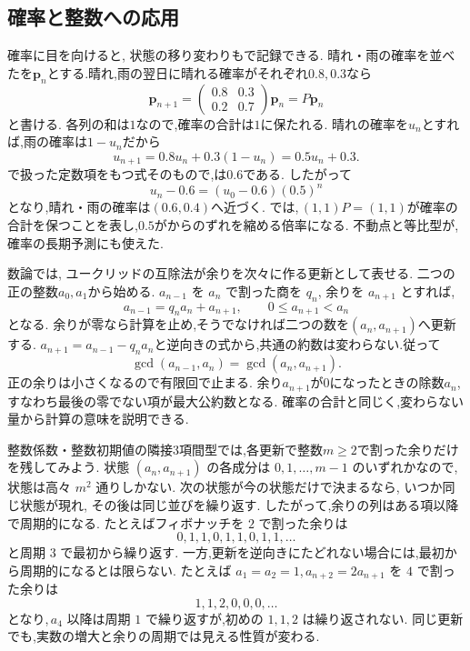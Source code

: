\subsection{確率と整数への応用}
確率に目を向けると, 状態の移り変わりもで記録できる.
晴れ・雨の確率を並べたを$\boldsymbol p_n$とする.晴れ,雨の翌日に晴れる確率がそれぞれ$0.8,0.3$なら
\[
  \boldsymbol p_{n+1}
  =
  \begin{pmatrix}0.8&0.3\\0.2&0.7\end{pmatrix}
  \boldsymbol p_n
  =P\boldsymbol p_n
\]
と書ける.
各列の和は$1$なので,確率の合計は$1$に保たれる.
晴れの確率を$u_n$とすれば,雨の確率は$1-u_n$だから
\[
  u_{n+1}=0.8u_n+0.3(1-u_n)=0.5u_n+0.3.
\]
で扱った定数項をもつ式そのもので,は$0.6$である.
したがって
\[
  u_n-0.6=(u_0-0.6)(0.5)^n
\]
となり,晴れ・雨の確率は$(0.6,0.4)$へ近づく.
では,\,$(1,1)P=(1,1)$が確率の合計を保つことを表し,$0.5$がからのずれを縮める倍率になる.
不動点と等比型が,確率の長期予測にも使えた.

数論では, ユークリッドの互除法が余りを次々に作る更新として表せる.
二つの正の整数$a_0,a_1$から始める.
$a_{n-1}$ を $a_n$ で割った商を $q_n$, 余りを $a_{n+1}$ とすれば,
\[
  a_{n-1}=q_na_n+a_{n+1},
  \qquad 0\le a_{n+1}<a_n
\]
となる.
余りが零なら計算を止め,そうでなければ二つの数を$(a_n,a_{n+1})$へ更新する.
$a_{n+1}=a_{n-1}-q_na_n$と逆向きの式から,共通の約数は変わらない.従って
\[
  \gcd(a_{n-1},a_n)=\gcd(a_n,a_{n+1}).
\]
正の余りは小さくなるので有限回で止まる.
余り$a_{n+1}$が$0$になったときの除数$a_n$,すなわち最後の零でない項が最大公約数となる.
確率の合計と同じく,変わらない量から計算の意味を説明できる.

整数係数・整数初期値の隣接3項間型では,各更新で整数$m\ge2$で割った余りだけを残してみよう.
状態 $(a_n,a_{n+1})$ の各成分は $0,1,\ldots,m-1$ のいずれかなので, 状態は高々 $m^2$ 通りしかない.
次の状態が今の状態だけで決まるなら, いつか同じ状態が現れ, その後は同じ並びを繰り返す.
したがって,余りの列はある項以降で周期的になる.
たとえばフィボナッチを $2$ で割った余りは
\[
  0,1,1,0,1,1,0,1,1,\ldots
\]
と周期 $3$ で最初から繰り返す.
一方,更新を逆向きにたどれない場合には,最初から周期的になるとは限らない.
たとえば $a_1=a_2=1$,\,$a_{n+2}=2a_{n+1}$ を $4$ で割った余りは
\[
  1,1,2,0,0,0,\ldots
\]
となり,\,$a_4$ 以降は周期 $1$ で繰り返すが,初めの $1,1,2$ は繰り返されない.
同じ更新でも,実数の増大と余りの周期では見える性質が変わる.


